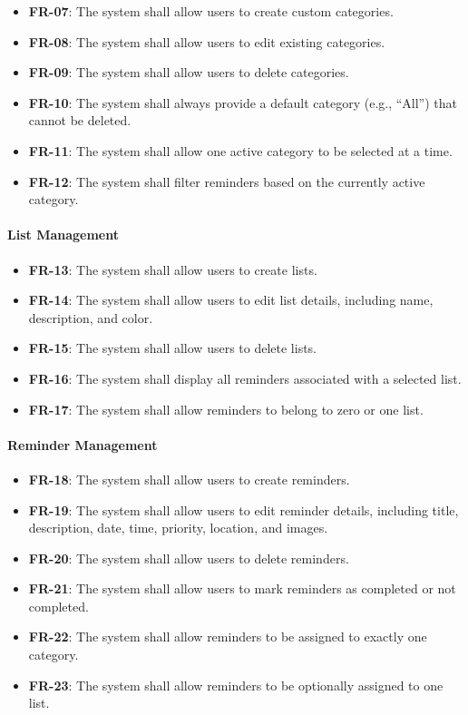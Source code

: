 \documentclass[runningheads,a4paper]{llncs}
\begin{document}
\begin{itemize}
  \item \textbf{FR-07}: The system shall allow users to create custom categories.
  \item \textbf{FR-08}: The system shall allow users to edit existing categories.
  \item \textbf{FR-09}: The system shall allow users to delete categories.
  \item \textbf{FR-10}: The system shall always provide a default category (e.g., ``All'') that cannot be deleted.
  \item \textbf{FR-11}: The system shall allow one active category to be selected at a time.
  \item \textbf{FR-12}: The system shall filter reminders based on the currently active category.
\end{itemize}

\paragraph{List Management}

\begin{itemize}
  \item \textbf{FR-13}: The system shall allow users to create lists.
  \item \textbf{FR-14}: The system shall allow users to edit list details, including name, description, and color.
  \item \textbf{FR-15}: The system shall allow users to delete lists.
  \item \textbf{FR-16}: The system shall display all reminders associated with a selected list.
  \item \textbf{FR-17}: The system shall allow reminders to belong to zero or one list.
\end{itemize}

\paragraph{Reminder Management}

\begin{itemize}
  \item \textbf{FR-18}: The system shall allow users to create reminders.
  \item \textbf{FR-19}: The system shall allow users to edit reminder details, including title, description, date, time, priority, location, and images.
  \item \textbf{FR-20}: The system shall allow users to delete reminders.
  \item \textbf{FR-21}: The system shall allow users to mark reminders as completed or not completed.
  \item \textbf{FR-22}: The system shall allow reminders to be assigned to exactly one category.
  \item \textbf{FR-23}: The system shall allow reminders to be optionally assigned to one list.
\end{itemize}
\end{document}
